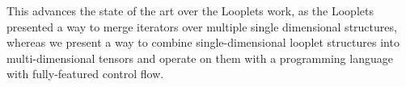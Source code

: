 \begin{enumerate}

\end{enumerate}

This advances the state of the art over the Looplets work, as the Looplets presented a way to merge iterators over multiple single dimensional structures, whereas we present a way to combine single-dimensional looplet structures into multi-dimensional tensors and operate on them with a programming language with fully-featured control flow.
